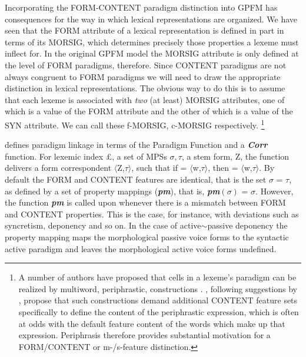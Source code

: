 \documentclass[output=paper,
modfonts
]{LSP/langsci}
\begin{document}
Incorporating the FORM-CONTENT paradigm distinction into GPFM has consequences for the way in which lexical representations are organized. We have seen that  the FORM attribute of a lexical representation is defined in part in terms of its MORSIG, which determines precisely those properties a lexeme must inflect for. In the original GPFM model the MORSIG attribute is only defined at the level of FORM paradigms, therefore. Since CONTENT paradigms are not always congruent to FORM paradigms we will need to draw the appropriate distinction in lexical representations. The obvious way to do this is to assume that each lexeme is associated with \emph{two} (at least) MORSIG attributes, one of which is a value  of the FORM attribute and the other of which is a value of the SYN attribute. We can call these f-MORSIG, c-MORSIG respectively.%
\footnote{A number of authors have proposed that cells in a lexeme’s paradigm can be realized by multiword, periphrastic, constructions \parencite{Sadler:Spencer01,Brown:etal12:periphrasis,Bonami15:collocation}. \textcite{Popova:Spencer17:FDSL11}, following suggestions by \textcite{Bonami15:collocation}, propose that such constructions demand additional CONTENT feature sets specifically to define the content of the periphrastic expression, which is often at odds with the default feature content of the words which make up that expression. Periphrasis therefore provides substantial  motivation for a FORM/CONTENT or m-/s-feature \parencite{Sadler:Spencer01} distinction.%
} %
 

\textcite[253]{Stump16:book} defines paradigm linkage in terms of the Paradigm Function and a \textbf{\textit{Corr}} function. For  lexemic index \pounds, a set of MPSs $\sigma, \tau$,  a stem form, Z, the function \Corr{ \pounds,$\sigma$} delivers a form correspondent $\langle$Z,$\tau$$\rangle$, such that if  = $\langle$w,$\tau$$\rangle$, then \PF{\pounds,$\sigma$} = $\langle$w,$\tau$$\rangle$. By default the FORM and CONTENT features are identical, that is the set $\sigma$ = $\tau$, as defined by a set of property mappings (\textbf{\textit{pm}}), that is, 
\textbf{\textit{pm}}$(\sigma)$ = $\sigma$. However, the function \textbf{\textit{pm}} is called upon whenever there is a mismatch between FORM and CONTENT properties. This is the case, for instance, with  deviations such as syncretism, deponency and so on. In the case of active$\sim$passive deponency the property mapping maps the morphological passive voice forms to the syntactic active paradigm and leaves the morphological active voice forms undefined. 
\end{document}
